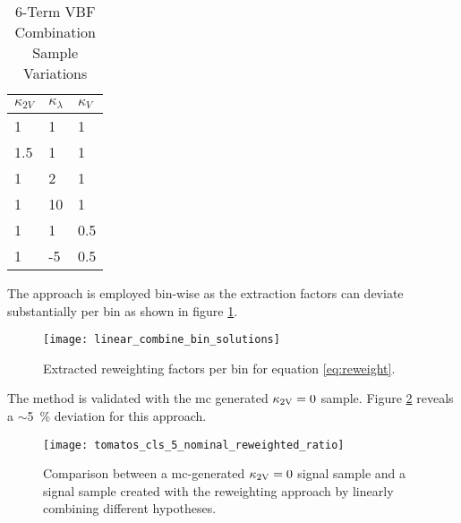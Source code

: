 \begin{table}
    \centering
    \caption{6-Term VBF Combination Sample Variations}
    \label{tab:vbf_hh_6term_varlist}
    \begin{tabular}{ |l|l|l| }
        \hline
        \textbf {$\kappa_{2V}$} & \textbf {$\kappa_\lambda$} & \textbf {$\kappa_V$} \\
        \hline
        1                       & 1                          & 1                    \\
        1.5                     & 1                          & 1                    \\
        1                       & 2                          & 1                    \\
        1                       & 10                         & 1                    \\
        1                       & 1                          & 0.5                  \\
        1                       & -5                         & 0.5                  \\
        \hline
    \end{tabular}
\end{table}
The approach is employed bin-wise as the extraction factors can deviate substantially per bin as shown in figure \ref{fig:linear_combine_bin_solutions}.
\begin{figure}
    \centering
    \texttt{[image: linear\_combine\_bin\_solutions]}
    \caption[]{Extracted reweighting factors per bin for equation \ref{eq:reweight}.}
    \label{fig:linear_combine_bin_solutions}
\end{figure}
The method is validated with the mc generated $\kappa_{\text{2V}}=0$ sample. Figure \ref{fig:tomatos_cls_5_nominal_reweighted_ratio} reveals a $\sim$\qty[]{5}{\percent} deviation for this approach. 
\begin{figure}
    \centering
    \texttt{[image: tomatos\_cls\_5\_nominal\_reweighted\_ratio]}
    \caption[]{Comparison between a \ac{mc}-generated $\kappa_{\text{2V}}=0$ signal sample and a signal sample created with the reweighting approach by linearly combining different \ktwov hypotheses. }
    \label{fig:tomatos_cls_5_nominal_reweighted_ratio}
\end{figure}


